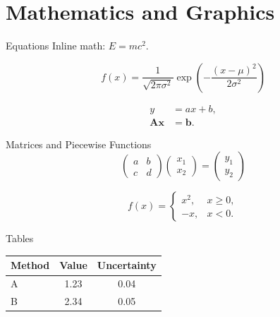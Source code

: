 \documentclass{beamer}
\begin{document}
\section{Mathematics and Graphics}

\begin{frame}{Equations}
    Inline math: $E = mc^2$.

    \[
        f(x) = \frac{1}{\sqrt{2\pi\sigma^2}}
        \exp\left(-\frac{(x-\mu)^2}{2\sigma^2}\right)
    \]

    \begin{align}
        y &= ax + b, \\ 
        \mathbf{A}\mathbf{x} &= \mathbf{b}.
    \end{align}
\end{frame}

\begin{frame}{Matrices and Piecewise Functions}
    \begin{equation}
        \begin{pmatrix}
            a & b \\
            c & d
        \end{pmatrix}
        \begin{pmatrix} x_1 \\ x_2 \end{pmatrix}
        = \begin{pmatrix} y_1 \\ y_2 \end{pmatrix}
        \label{eq:linear-system}
    \end{equation}

    \[
        f(x) =
        \begin{cases}
            x^2, & x \geq 0, \\
            -x,  & x < 0.
        \end{cases}
    \]
\end{frame}

\begin{frame}{Tables}
    \centering
    \begin{tabular}{lcc}
        \toprule
        Method & Value & Uncertainty \\
        \midrule
        A & 1.23 & 0.04 \\
        B & 2.34 & 0.05 \\
        \bottomrule
    \end{tabular}
\end{frame}
\end{document}
